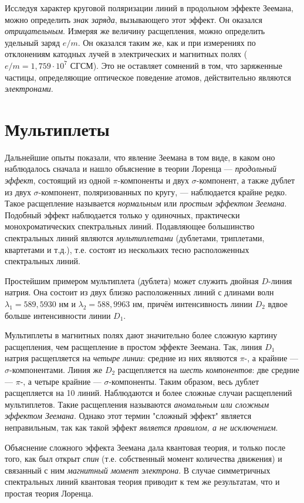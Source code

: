 \documentclass[12pt]{article}
\begin{document}
  Исследуя характер круговой поляризации линий в продольном эффекте Зеемана, можно определить \textit{знак заряда}, вызывающего этот эффект. Он оказался \textit{отрицательным}. Измеряя же величину расщепления, можно определить удельный заряд $e/m$. Он оказался таким же, как и при измерениях по отклонениям катодных лучей в электрических и магнитных полях
  ($e/m = 1{,}759 \cdot 10^7$ СГСМ). Это не оставляет сомнений в том, что заряженные частицы, определяющие оптическое поведение атомов, действительно являются \textit{электронами}.

  \section{Мультиплеты}
  Дальнейшие опыты показали, что явление Зеемана в том виде, в каком оно наблюдалось сначала и нашло объяснение в теории Лоренца — \textit{продольный эффект}, состоящий из одной $\pi$-компоненты и двух $\sigma$-компонент, а также дублет из двух $\sigma$-компонент, поляризованных по кругу, — наблюдается крайне редко. Такое расщепление называется \textit{нормальным} или \textit{простым эффектом Зеемана}. Подобный эффект наблюдается только у одиночных, практически монохроматических спектральных линий. Подавляющее большинство спектральных линий являются \textit{мультиплетами} (дублетами, триплетами, квартетами и т.д.), т.е. состоят из нескольких тесно расположенных спектральных линий.

  Простейшим примером мультиплета (дублета) может служить двойная $D$-линия натрия. Она состоит из двух близко расположенных линий с длинами волн $\lambda_1 = 589{,}5930$ нм и $\lambda_2 = 588{,}9963$ нм, причём интенсивность линии $D_2$ вдвое больше интенсивности линии $D_1$.

  Мультиплеты в магнитных полях дают значительно более сложную картину расщепления, чем расщепление в простом эффекте Зеемана. Так, линия $D_1$ натрия расщепляется на \textit{четыре линии}: средние из них являются $\pi$-, а крайние — $\sigma$-компонентами. Линия же $D_2$ расщепляется на \textit{шесть компонентов}: две средние — $\pi$-, а четыре крайние — $\sigma$-компоненты. Таким образом, весь дублет расщепляется на 10 линий. Наблюдаются и более сложные случаи расщеплений мультиплетов. Такие расщепления называются \textit{аномальным или сложным эффектом Зеемана}. Однако этот термин "сложный эффект" является неправильным, так как такой эффект \textit{является правилом, а не исключением}.

  Объяснение сложного эффекта Зеемана дала квантовая теория, и только после того, как был открыт \textit{спин} (т.е. собственный момент количества движения) и связанный с ним \textit{магнитный момент электрона}. В случае симметричных спектральных линий квантовая теория приводит к тем же результатам, что и простая теория Лоренца.

  
  
\end{document}
